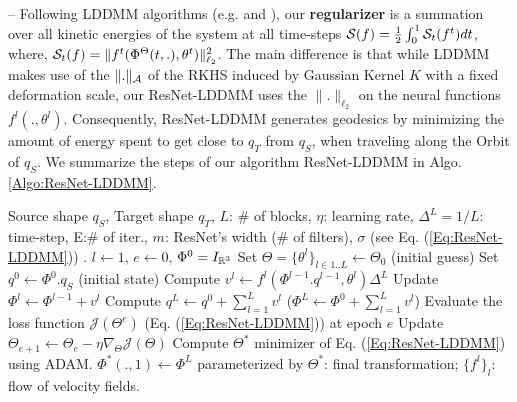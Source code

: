 -- Following LDDMM algorithms (e.g. \cite{younes2009evolutions} and \cite{miller2006geodesic}), our \textbf{regularizer} is a summation over all kinetic energies of the system at all time-steps ${\cal S}(f)=\frac{1}{2}\int_0^1 {\cal S}_t(f^t) dt$, where, ${\cal S}_t(f)=\| f^t(\Phi^{\Theta}(t,.),\theta^{t}) \|_{\ell_2}^2$. The main difference is that while LDDMM makes use of the $\|.\|_{\cal A}$ of the RKHS induced by Gaussian Kernel $K$ with a fixed deformation scale, our ResNet-LDDMM uses the $\|.\|_{\ell_2}$ on the neural functions $f^l(.,\theta^l)$. Consequently, ResNet-LDDMM generates geodesics by minimizing the amount of energy spent to get close to $q_T$ from $q_S$, when traveling along the Orbit of $q_S$. We summarize the steps of our algorithm ResNet-LDDMM in Algo. \ref{Algo:ResNet-LDDMM}.    

\begin{algorithm}
\caption{ResNet-LDDMM.}
\begin{algorithmic}%
\REQUIRE Source shape $q_{S}$, Target shape $q_{T}$, $L$: \# of blocks, $\eta$: learning rate, $\Delta^L = 1/L$: time-step, E:\# of iter., $m$: ResNet's width (\# of filters), $\sigma$ (see Eq. (\ref{Eq:ResNet-LDDMM})) .  
 \STATE $ l \leftarrow 1$, $e \leftarrow 0$, $\Phi^0=I_{\mathbb{R}^3}$
 \STATE Set $ \Theta=\{\theta^l\}_{l \in {1..L}} \leftarrow \Theta_0$ (initial guess)
 \STATE Set $q^{0} \leftarrow \Phi^0.q_S$ (initial state)
  \STATE Compute $v^{l} \leftarrow f^{l}(\Phi^{l-1}.q^{l-1},\theta^{l})\Delta^L$
  \STATE Update $\Phi^{l} \leftarrow \Phi^{l-1} + v^{l}$ %
  \ENDWHILE
  \STATE Compute $q^{L}\leftarrow q^0+\sum_{l=1}^{L} v^l$ ($\Phi^{L}\leftarrow \Phi^0+\sum_{l=1}^{L} v^l$)
  \STATE Evaluate the loss function $\mathcal{J}(\Theta^{e})$ (Eq. (\ref{Eq:ResNet-LDDMM})) at epoch $e$
  \STATE Update $\Theta_{e+1} \leftarrow \Theta_{e} - \eta \nabla_{\Theta} \mathcal{J}(\Theta)$ %
\ENDWHILE
\STATE Compute $\Theta^*$ minimizer of Eq. (\ref{Eq:ResNet-LDDMM}) using ADAM.
   \ENSURE $\Phi^*(.,1) \leftarrow \Phi^{L}$ parameterized by $\Theta^*$: final transformation; $\{f^l\}_l$: flow of velocity fields.
 \end{algorithmic} 
\label{Algo:ResNet-LDDMM}
\end{algorithm}

